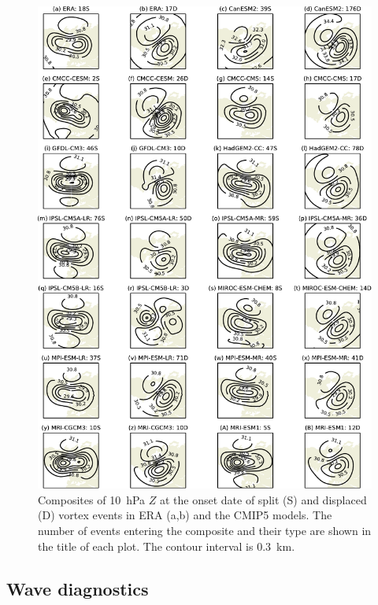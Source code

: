 \begin{figure}
 \centering
 \noindent\includegraphics[width=\textwidth]{figures/chapter-models/10hPa_GPH_composites.pdf}
 \caption[Composites of 10~hPa $Z$ at the onset date split and displaced vortex
 events in the CMIP5 models.]{Composites of 10~hPa $Z$ at the onset date of
   split (S) and displaced (D) vortex events in ERA (a,b) and the CMIP5
   models. The number of events entering the composite and their type are
   shown in the title of each plot. The contour interval is 0.3~km.}
 \label{fig:10hPa_GPH_comp}
\end{figure}

\subsection{Wave diagnostics}

